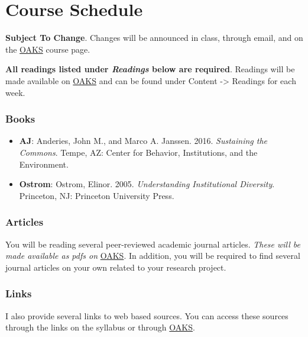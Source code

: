 \hypertarget{course-schedule}{%
\section{Course Schedule}\label{course-schedule}}

\textbf{Subject To Change}. Changes will be announced in class, through
email, and on the \href{https://lms.cofc.edu}{OAKS} course page.

\vspace{0.10in}

\noindent \textbf{All readings listed under \emph{Readings} below are
required}. Readings will be made available on
\href{https://lms.cofc.edu}{OAKS} and can be found under Content
-\textgreater{} Readings for each week.

\hypertarget{books}{%
\subsubsection{Books}\label{books}}

\begin{itemize}

\item
  \textbf{AJ}: Anderies, John M., and Marco A. Janssen. 2016.
  \emph{Sustaining the Commons}. Tempe, AZ: Center for Behavior,
  Institutions, and the Environment.
\item
  \textbf{Ostrom}: Ostrom, Elinor. 2005. \emph{Understanding
  Institutional Diversity}. Princeton, NJ: Princeton University Press.
\end{itemize}

\hypertarget{articles}{%
\subsubsection{Articles}\label{articles}}

You will be reading several peer-reviewed academic journal articles.
\emph{These will be made available as pdfs on}
\href{https://lms.cofc.edu}{OAKS}. In addition, you will be required to
find several journal articles on your own related to your research
project.

\hypertarget{links}{%
\subsubsection{Links}\label{links}}

I also provide several links to web based sources. You can access these
sources through the links on the syllabus or through
\href{https://lms.cofc.edu}{OAKS}.


